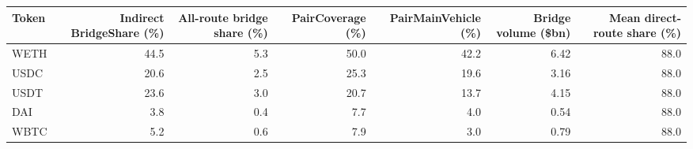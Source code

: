 \begin{tabular}{lrrrrrr}
\toprule
Token & Indirect BridgeShare (\%) & All-route bridge share (\%) & PairCoverage (\%) & PairMainVehicle (\%) & Bridge volume (\$bn) & Mean direct-route share (\%) \\
\midrule
WETH & 44.5 & 5.3 & 50.0 & 42.2 & 6.42 & 88.0 \\
USDC & 20.6 & 2.5 & 25.3 & 19.6 & 3.16 & 88.0 \\
USDT & 23.6 & 3.0 & 20.7 & 13.7 & 4.15 & 88.0 \\
DAI & 3.8 & 0.4 & 7.7 & 4.0 & 0.54 & 88.0 \\
WBTC & 5.2 & 0.6 & 7.9 & 3.0 & 0.79 & 88.0 \\
\bottomrule
\end{tabular}

